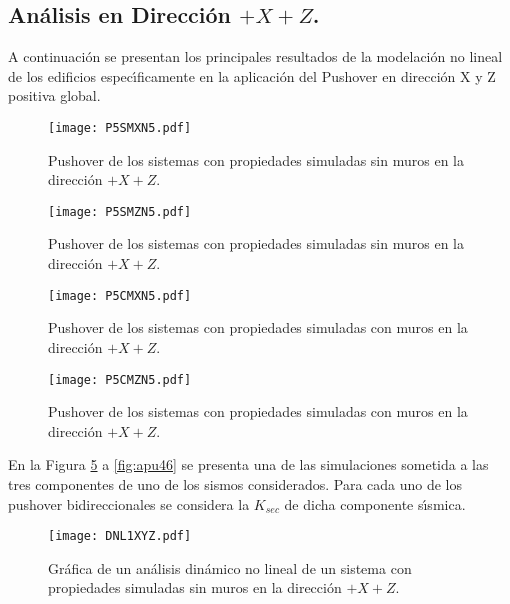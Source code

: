 \paragraph{}

\newpage

\subsection{An\'alisis en Direcci\'on $+X+Z$.}

A continuaci\'on se presentan los principales resultados de la modelaci\'on no lineal de los edificios espec\'{\i}ficamente en la aplicaci\'on del Pushover en direcci\'on X y Z positiva global.

\begin{figure} [htbp]
\texttt{[image: P5SMXN5.pdf]}
\caption{Pushover de los sistemas con propiedades simuladas sin muros en la direcci\'on $+X+Z$.}
\label{fig:apu39}
\end{figure}

\begin{figure} [htbp]
\texttt{[image: P5SMZN5.pdf]}
\caption{Pushover de los sistemas con propiedades simuladas sin muros en la direcci\'on $+X+Z$.}
\label{fig:apu40}
\end{figure}

\begin{figure} [htbp]
\texttt{[image: P5CMXN5.pdf]}
\caption{Pushover de los sistemas con propiedades simuladas con muros en la direcci\'on $+X+Z$.}
\label{fig:apu41}
\end{figure}

\begin{figure} [htbp]
\texttt{[image: P5CMZN5.pdf]}
\caption{Pushover de los sistemas con propiedades simuladas con muros en la direcci\'on $+X+Z$.}
\label{fig:apu42}
\end{figure}

En la Figura \ref{fig:apu43} a \ref{fig:apu46} se presenta una de las simulaciones sometida a las tres componentes de uno de los sismos considerados. Para cada uno de los pushover bidireccionales se considera la $K_{sec}$ de dicha componente s\'{\i}smica. 

\begin{figure} [htbp]
\texttt{[image: DNL1XYZ.pdf]}
\caption{Gr\'afica de un an\'alisis din\'amico no lineal de un sistema con propiedades simuladas sin muros en la direcci\'on $+X+Z$.}
\label{fig:apu43}
\end{figure}

